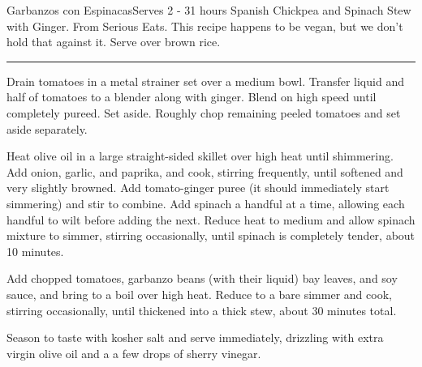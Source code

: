 \begin{recipe}{Garbanzos con Espinacas}{Serves 2 - 3}{1 hours}
\freeform
Spanish Chickpea and Spinach Stew with Ginger. From Serious Eats. This recipe happens to be vegan, but we don't hold that against it. Serve over brown rice.\\
\rule{\textwidth}{0.05pt}


Drain tomatoes in a metal strainer set over a medium bowl. Transfer liquid and half of tomatoes to a blender along with ginger. Blend on high speed until completely pureed. Set aside. Roughly chop remaining peeled tomatoes and set aside separately.
\newline
{}

Heat olive oil in a large straight-sided skillet over high heat until shimmering. Add onion, garlic, and paprika, and cook, stirring frequently, until softened and very slightly browned. Add tomato-ginger puree (it should immediately start simmering) and stir to combine. Add spinach a handful at a time, allowing each handful to wilt before adding the next. Reduce heat to medium and allow spinach mixture to simmer, stirring occasionally, until spinach is completely tender, about 10 minutes.
\newline
{}

Add chopped tomatoes, garbanzo beans (with their liquid) bay leaves, and soy sauce, and bring to a boil over high heat. Reduce to a bare simmer and cook, stirring occasionally, until thickened into a thick stew, about 30 minutes total.
\newline
{}

Season to taste with kosher salt and serve immediately, drizzling with extra virgin olive oil and a a few drops of sherry vinegar.

\end{recipe}
